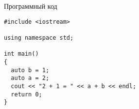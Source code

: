 \documentclass{bacgost}
\begin{document}
\begin{gostappendix}{Программный код}
\lstset{language=[11]c++,basicstyle=\ttfamily, showstringspaces=false}

\begin{lstlisting}
#include <iostream>

using namespace std;

int main()
{
  auto b = 1;
  auto a = 2;
  cout << "2 + 1 = " << a + b << endl;
  return 0;
}
\end{lstlisting}

\end{gostappendix}
\end{document}
